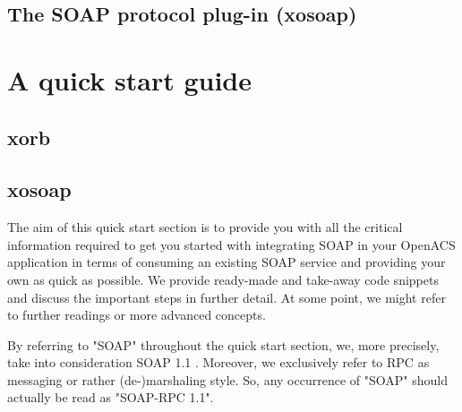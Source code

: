 	\subsection{The SOAP protocol plug-in (xosoap)}
  \section{A quick start guide}\label{sec:quickstart}
  \subsection{xorb}\label{sec:quickstart:xorb}
  \subsection{xosoap}\label{sec:quickstart:xosoap}
  The aim of this quick start section is to provide you with all the critical information required to get you 
started with integrating SOAP in your OpenACS application in terms of consuming an existing SOAP 
service and providing your own as quick as possible. We provide ready-made and take-away code 
snippets and discuss the important steps in further detail. At some point, we might refer to further 
readings or more advanced concepts. 
\begin{hints}
\item By referring to "SOAP" throughout the quick start section, we, more precisely, take into consideration SOAP 1.1 \cite{w3c:2000}. Moreover, we exclusively refer to RPC as messaging or rather (de-)marshaling style. So, any occurrence of "SOAP" should actually be read as "SOAP-RPC 1.1".
\end{hints}
